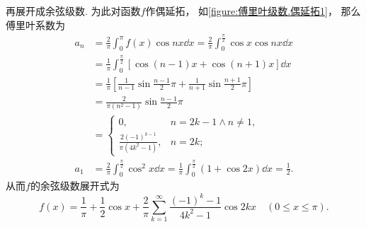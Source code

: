 \begin{example}
\begin{solution}
再展开成余弦级数.
为此对函数\(f\)作偶延拓，
如\cref{figure:傅里叶级数.偶延拓1}，
那么傅里叶系数为\begin{align*}
	a_n &= \frac{2}{\pi} \int_0^\pi f(x) \cos nx \dd{x}
	= \frac{2}{\pi} \int_0^{\frac{\pi}{2}} \cos x \cos nx \dd{x} \\
	&= \frac{1}{\pi} \int_0^{\frac{\pi}{2}} [\cos(n-1)x + \cos(n+1)x] \dd{x} \\
	&= \frac{1}{\pi} \left[
			\frac{1}{n-1} \sin\frac{n-1}{2}\pi
			+ \frac{1}{n+1} \sin\frac{n+1}{2}\pi
		\right] \\
	&= \frac{2}{\pi(n^2-1)} \sin\frac{n-1}{2}\pi \\
	&= \left\{ \begin{array}{cl}
		0, & n=2k-1 \land n\neq1, \\
		\frac{2(-1)^{k-1}}{\pi(4k^2-1)}, & n=2k;
	\end{array} \right. \\
	a_1 &= \frac{2}{\pi} \int_0^{\frac{\pi}{2}} \cos^2 x \dd{x}
	= \frac{1}{\pi} \int_0^{\frac{\pi}{2}} (1+\cos 2x) \dd{x}
	= \frac{1}{2}.
\end{align*}
从而\(f\)的余弦级数展开式为\[
	f(x) = \frac{1}{\pi} + \frac{1}{2} \cos x + \frac{2}{\pi}
		\sum_{k=1}^\infty \frac{(-1)^k-1}{4k^2-1} \cos 2kx
	\quad(0 \leq x \leq \pi).
\]
\end{solution}
\end{example}

